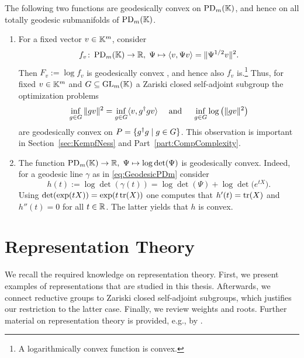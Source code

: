 \begin{example}\label{ex:GeodesicConvexFunctions}
	The following two functions are geodesically convex on $\operatorname{PD}_m(\mathbb K)$, and hence on all totally geodesic submanifolds of $\operatorname{PD}_m(\mathbb K)$.
	\begin{enumerate}\itemsep1pt
		\item For a fixed vector $v \in \mathbb K^m$, consider 
		\[ f_v \colon \operatorname{PD}_m(\mathbb K) \to \mathbb R, \; \Psi \mapsto \langle v, \Psi v \rangle = \| \Psi^{1/2} v\|^2. \]
		Then $F_v := \log f_v$ is geodesically convex \cite[Proposition~3.13]{GradflowArXiv}, and hence also $f_v$ is.\footnote{A logarithmically convex function is convex.}
		Thus, for fixed $v \in \mathbb K^m$ and $G \subseteq \operatorname{GL}_m(\mathbb K)$ a Zariski closed self-adjoint subgroup the optimization problems
			\[ \inf_{g \in G} \|gv\|^2 = \inf_{g \in G} \langle v, g^{\dagger} g v \rangle \quad \text{ and } \quad
			\inf_{g \in G} \log \big( \|gv \|^2 \big)	\]
		are geodesically convex on $P = \{ g^{\dagger} g \mid g \in G \}$.
		This observation is important in Section~\ref{sec:KempfNess} and Part~\ref{part:CompComplexity}.
		
		\item The function $\operatorname{PD}_m(\mathbb K) \to \mathbb R, \; \Psi \mapsto \log \det(\Psi)$ is geodesically convex. Indeed, for a geodesic line $\gamma$ as in \eqref{eq:GeodesicPDm} consider
			\[ h(t) := \log \det(\gamma(t)) = \log \det(\Psi) + \log \det \big( e^{tX} \big) . \]
		Using $\det(\exp(tX)) = \exp(t \operatorname{tr}(X))$ one computes that $h'(t) = \operatorname{tr}(X)$ and $h''(t) = 0$ for all $t \in \mathbb R$. The latter yields that $h$ is convex.
		\hfill\exSymbol
	\end{enumerate}
\end{example}








\section{Representation Theory} \label{sec:RepTheory}

We recall the required knowledge on representation theory. First, we present examples of representations that are studied in this thesis. Afterwards, we connect reductive groups to Zariski closed self-adjoint subgroups, which justifies our restriction to the latter case. Finally, we review weights and roots. Further material on representation theory is provided, e.g., by \cite{borel2006lie, FultonHarris, HallBook, OnishchikVinbergBook, ProcesiBook}.


